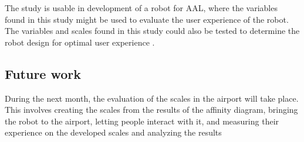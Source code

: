 The study is usable in development of a robot for AAL, where the variables found in this study might be used to evaluate the user experience of the robot. The variables and scales found in this study could also be tested to determine the robot design for optimal user experience .


\subsection{Future work}
During the next month, the evaluation of the scales in the airport will take place. This involves creating the scales from the results of the affinity diagram, bringing the robot to the airport, letting people interact with it, and measuring their experience on the developed scales and analyzing the results

